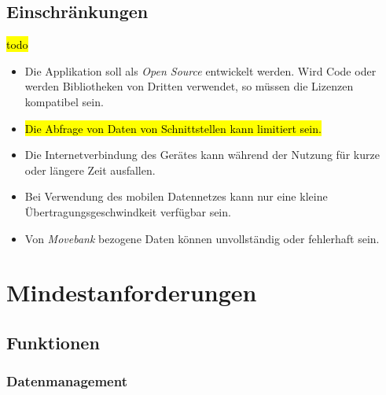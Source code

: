 \documentclass[12pt]{article} %
\begin{document}

\subsection{Einschränkungen}

\hl{todo}

\begin{itemize} 
	\item Die Applikation soll als \textit{Open Source} entwickelt werden. Wird Code oder werden Bibliotheken von Dritten verwendet, so müssen die Lizenzen kompatibel sein.
	\item \hl{Die Abfrage von Daten von Schnittstellen kann limitiert sein.}
	\item Die Internetverbindung des Gerätes kann während der Nutzung für kurze oder längere Zeit ausfallen.
	\item Bei Verwendung des mobilen Datennetzes kann nur eine kleine Übertragungsgeschwindkeit verfügbar sein.
	\item Von \textit{Movebank} bezogene Daten können unvollständig oder fehlerhaft sein.
\end{itemize} 




\newpage
\section{Mindestanforderungen} \label{mindestanforderungen}


\subsection{Funktionen}

\subsubsection{Datenmanagement}
\end{document}
